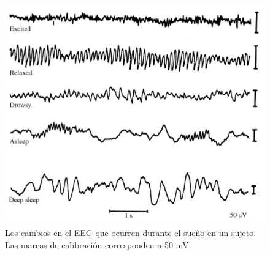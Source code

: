 \begin{figure}
\centering
\includegraphics[width=0.7\linewidth]{figura_7.png} 
\caption{Los cambios en el EEG que ocurren durante el sue\~no en un sujeto.
Las marcas de calibraci\'on corresponden a 50 mV.
}
\label{ritmosEEG}
\end{figure}


